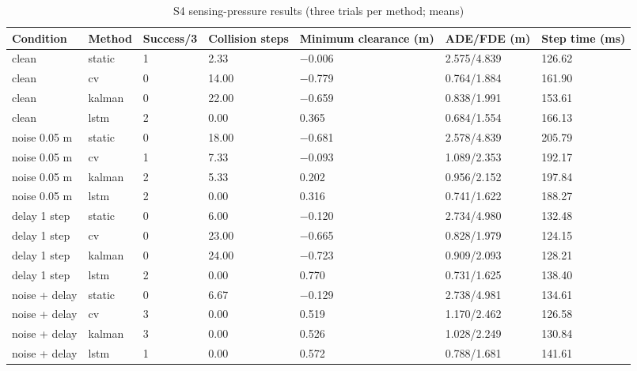 \documentclass[10pt,a4paper]{article}
\begin{document}
\begin{table}[t]
\centering
\small
\caption{S4 sensing-pressure results (three trials per method; means)}
\label{tab:table-7}
\begin{tabularx}{\linewidth}{YYYYYYY}
\toprule
Condition & Method & Success/3 & Collision steps & Minimum clearance (m) & ADE/FDE (m) & Step time (ms) \\
\midrule
clean & static & 1 & 2.33 & −0.006 & 2.575/4.839 & 126.62 \\
clean & cv & 0 & 14.00 & −0.779 & 0.764/1.884 & 161.90 \\
clean & kalman & 0 & 22.00 & −0.659 & 0.838/1.991 & 153.61 \\
clean & lstm & 2 & 0.00 & 0.365 & 0.684/1.554 & 166.13 \\
noise 0.05 m & static & 0 & 18.00 & −0.681 & 2.578/4.839 & 205.79 \\
noise 0.05 m & cv & 1 & 7.33 & −0.093 & 1.089/2.353 & 192.17 \\
noise 0.05 m & kalman & 2 & 5.33 & 0.202 & 0.956/2.152 & 197.84 \\
noise 0.05 m & lstm & 2 & 0.00 & 0.316 & 0.741/1.622 & 188.27 \\
delay 1 step & static & 0 & 6.00 & −0.120 & 2.734/4.980 & 132.48 \\
delay 1 step & cv & 0 & 23.00 & −0.665 & 0.828/1.979 & 124.15 \\
delay 1 step & kalman & 0 & 24.00 & −0.723 & 0.909/2.093 & 128.21 \\
delay 1 step & lstm & 2 & 0.00 & 0.770 & 0.731/1.625 & 138.40 \\
noise + delay & static & 0 & 6.67 & −0.129 & 2.738/4.981 & 134.61 \\
noise + delay & cv & 3 & 0.00 & 0.519 & 1.170/2.462 & 126.58 \\
noise + delay & kalman & 3 & 0.00 & 0.526 & 1.028/2.249 & 130.84 \\
noise + delay & lstm & 1 & 0.00 & 0.572 & 0.788/1.681 & 141.61 \\
\bottomrule
\end{tabularx}
\end{table}
\end{document}
